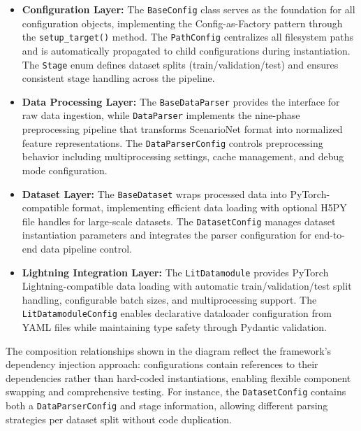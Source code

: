 \begin{itemize}[leftmargin=*]
    \item \textbf{Configuration Layer:} The \texttt{BaseConfig} class serves as the foundation for all configuration objects, implementing the Config-as-Factory pattern through the \texttt{setup\_target()} method. The \texttt{PathConfig} centralizes all filesystem paths and is automatically propagated to child configurations during instantiation. The \texttt{Stage} enum defines dataset splits (train/validation/test) and ensures consistent stage handling across the pipeline.
    
    \item \textbf{Data Processing Layer:} The \texttt{BaseDataParser} provides the interface for raw data ingestion, while \texttt{DataParser} implements the nine-phase preprocessing pipeline that transforms ScenarioNet format into normalized feature representations. The \texttt{DataParserConfig} controls preprocessing behavior including multiprocessing settings, cache management, and debug mode configuration.
    
    \item \textbf{Dataset Layer:} The \texttt{BaseDataset} wraps processed data into PyTorch-compatible format, implementing efficient data loading with optional H5PY file handles for large-scale datasets. The \texttt{DatasetConfig} manages dataset instantiation parameters and integrates the parser configuration for end-to-end data pipeline control.
    
    \item \textbf{Lightning Integration Layer:} The \texttt{LitDatamodule} provides PyTorch Lightning-compatible data loading with automatic train/validation/test split handling, configurable batch sizes, and multiprocessing support. The \texttt{LitDatamoduleConfig} enables declarative dataloader configuration from YAML files while maintaining type safety through Pydantic validation.
\end{itemize}

The composition relationships shown in the diagram reflect the framework's dependency injection approach: configurations contain references to their dependencies rather than hard-coded instantiations, enabling flexible component swapping and comprehensive testing. For instance, the \texttt{DatasetConfig} contains both a \texttt{DataParserConfig} and stage information, allowing different parsing strategies per dataset split without code duplication.

